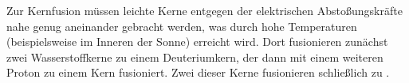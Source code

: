 \documentclass[a4paper]{scrartcl}
\begin{document}
Zur Kernfusion müssen leichte Kerne entgegen der elektrischen Abstoßungskräfte nahe genug aneinander gebracht werden, was durch hohe Temperaturen (beispielsweise im Inneren der Sonne) erreicht wird. Dort fusionieren zunächst zwei  Wasserstoffkerne zu einem  Deuteriumkern, der dann mit einem weiteren Proton zu einem  Kern fusioniert. Zwei dieser Kerne fusionieren schließlich zu . 
\end{document}

